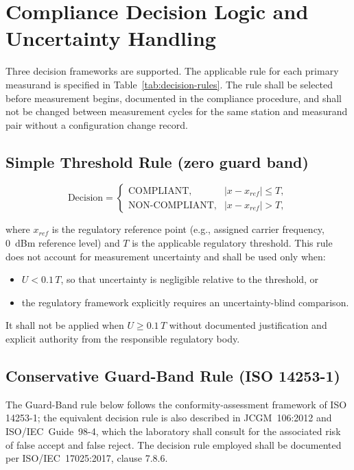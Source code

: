 \documentclass[11pt]{article}
\begin{document}
\section{Compliance Decision Logic and Uncertainty Handling}

Three decision frameworks are supported. The applicable rule for each primary measurand is specified in Table~\ref{tab:decision-rules}. The rule shall be selected before measurement begins, documented in the compliance procedure, and shall not be changed between measurement cycles for the same station and measurand pair without a configuration change record.

\subsection*{Simple Threshold Rule (zero guard band)}

\begin{equation}
\text{Decision} =
\begin{cases}
\text{COMPLIANT}, & |x - x_{ref}| \leq T, \\
\text{NON-COMPLIANT}, & |x - x_{ref}| > T,
\end{cases}
\label{eq:simple}
\end{equation}

where $x_{ref}$ is the regulatory reference point (e.g., assigned carrier frequency, 0~dBm reference level) and $T$ is the applicable regulatory threshold. This rule does not account for measurement uncertainty and shall be used only when:
\begin{itemize}
    \item $U < 0.1\,T$, so that uncertainty is negligible relative to the threshold, or
    \item the regulatory framework explicitly requires an uncertainty-blind comparison.
\end{itemize}
It shall not be applied when $U \geq 0.1\,T$ without documented justification and explicit authority from the responsible regulatory body.

\subsection*{Conservative Guard-Band Rule (ISO 14253-1)}

The Guard-Band rule below follows the conformity-assessment framework of ISO 14253-1; the equivalent decision rule is also described in JCGM~106:2012 and ISO/IEC~Guide~98-4, which the laboratory shall consult for the associated risk of false accept and false reject. The decision rule employed shall be documented per ISO/IEC~17025:2017, clause 7.8.6.
\end{document}

